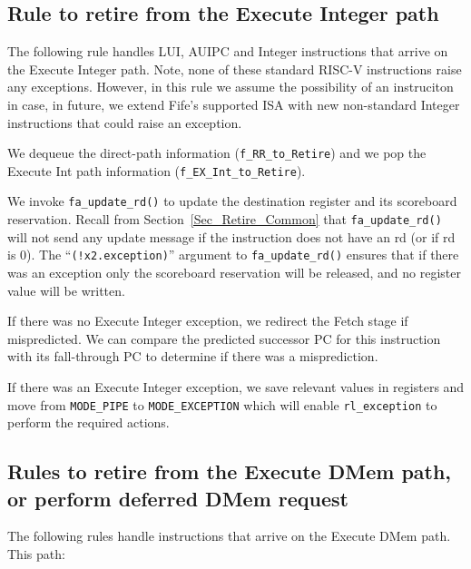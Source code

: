 
\subsection{Rule to retire from the Execute Integer path}

\label{Sec_Fife_Retire_Int}

The following rule handles LUI, AUIPC and Integer instructions that
arrive on the Execute Integer path.  Note, none of these standard
RISC-V instructions raise any exceptions.  However, in this rule we
assume the possibility of an instruciton in case, in future, we extend
Fife's supported ISA with new non-standard Integer instructions that
could raise an exception.



We dequeue the direct-path information (\verb|f_RR_to_Retire|) and we
pop the Execute Int path information (\verb|f_EX_Int_to_Retire|).

We invoke \verb|fa_update_rd()| to update the destination register and
its scoreboard reservation.  Recall from
Section~\ref{Sec_Retire_Common} that \verb|fa_update_rd()| will not
send any update message if the instruction does not have an rd (or if
rd is 0).  The ``\verb|(!x2.exception)|'' argument to
\verb|fa_update_rd()| ensures that if there was an exception only the
scoreboard reservation will be released, and no register value will be
written.

If there was no Execute Integer exception, we redirect the Fetch stage
if mispredicted.  We can compare the predicted successor PC for this
instruction with its fall-through PC to determine if there was a
misprediction.

If there was an Execute Integer exception, we save relevant values in
registers and move from \verb|MODE_PIPE| to \verb|MODE_EXCEPTION|
which will enable \verb|rl_exception| to perform the required actions.


\subsection{Rules to retire from the Execute DMem path, or perform deferred DMem request}

\label{Sec_Fife_S5_DMem}

The following rules handle instructions that arrive on the Execute
DMem path.  This path:

